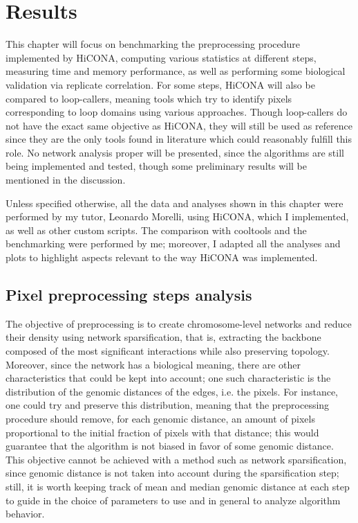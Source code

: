 \graphicspath{{chapters/05_results/images}}
\chapter{Results}


This chapter will focus on benchmarking the preprocessing procedure implemented by HiCONA, computing various statistics at different steps, measuring time and memory performance, as well as performing some biological validation via replicate correlation. For some steps, HiCONA will also be compared to loop-callers, meaning tools which try to identify pixels corresponding to loop domains using various approaches. Though loop-callers do not have the exact same objective as HiCONA, they will still be used as reference since they are the only tools found in literature which could reasonably fulfill this role. No network analysis proper will be presented, since the algorithms are still being implemented and tested, though some preliminary results will be mentioned in the discussion.

Unless specified otherwise, all the data and analyses shown in this chapter were performed by my tutor, Leonardo Morelli, using HiCONA, which I implemented, as well as other custom scripts. The comparison with cooltools and the benchmarking were performed by me; moreover, I adapted all the analyses and plots to highlight aspects relevant to the way HiCONA was implemented.

\section{Pixel preprocessing steps analysis}

The objective of preprocessing is to create chromosome-level networks and reduce their density using network sparsification, that is, extracting the backbone composed of the most significant interactions while also preserving topology. Moreover, since the network has a biological meaning, there are other characteristics that could be kept into account; one such characteristic is the distribution of the genomic distances of the edges, i.e. the pixels. For instance, one could try and preserve this distribution, meaning that the preprocessing procedure should remove, for each genomic distance, an amount of pixels proportional to the initial fraction of pixels with that distance; this would guarantee that the algorithm is not biased in favor of some genomic distance. This objective cannot be achieved with a method such as network sparsification, since genomic distance is not taken into account during the sparsification step; still, it is worth keeping track of mean and median genomic distance at each step to guide in the choice of parameters to use and in general to analyze algorithm behavior. 

